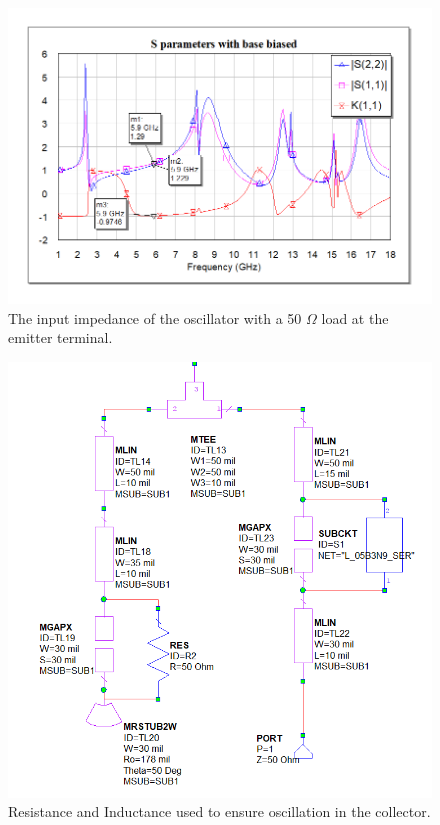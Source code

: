 \documentclass{article}
\begin{document}
 \begin{figure}[!htbp]
    \centering
    \includegraphics[scale=0.4]{input_impedance.png}
    \caption{The input impedance of the oscillator with a 50 $\Omega$ load at the emitter terminal.}
    \label{fig:inputimpedance}
\end{figure}

\begin{figure}[!htbp]
    \centering
    \includegraphics[scale=0.4]{collector_bias_1.png}
    \caption{Resistance and Inductance used to ensure oscillation in the collector.}
    \label{fig:collbias1}
\end{figure}
\end{document}
